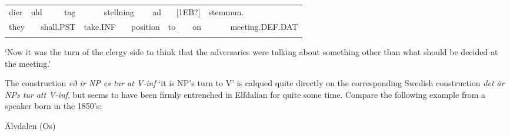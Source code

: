 \begin{tabular}{llllllllllllll}
\lsptoprule
dier & \multicolumn{2}{l}{uld

} & \multicolumn{2}{l}{tag

} & \multicolumn{2}{l}{stellning

} & \multicolumn{2}{l}{ad

} & \multicolumn{2}{l}{[1EB?]

} & \multicolumn{2}{l}{stemmun.

} & \\
\multicolumn{2}{l}{they

} & \multicolumn{2}{l}{shall.PST

} & \multicolumn{2}{l}{take.INF

} & \multicolumn{2}{l}{position

} & \multicolumn{2}{l}{to

} & \multicolumn{2}{l}{on

} & \multicolumn{2}{l}{meeting.DEF.DAT

}\\
\lspbottomrule
\end{tabular}

\begin{styleTranslation}
‘Now it was the turn of the clergy side to think that the adversaries were talking about something other than what should be decided at the meeting.’ 

\end{styleTranslation}

\begin{styleBodyTextFirst}
The construction \textit{eð ir NP es tur at V-inf} ‘it is NP’s turn to V’ is calqued quite directly on the corresponding Swedish construction \textit{det är NPs tur att V-inf}, but seems to have been firmly entrenched in Elfdalian for quite some time. Compare the following example from a speaker born in the 1850’s:

\end{styleBodyTextFirst}

\begin{listWWNumileveli}
\item {}

\begin{styleExample}
\label{bkm:Ref135470154}Älvdalen (Os)

\end{styleExample}

\end{listWWNumileveli}

